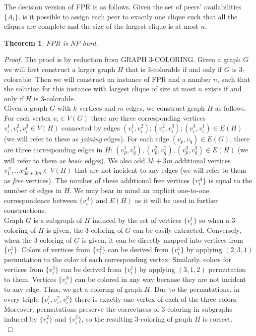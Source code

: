 \documentclass{pracamgren}
\newcounter{collective_ctr} \numberwithin{collective_ctr}{chapter}
\newtheorem{theorem}[collective_ctr]{Theorem}
\begin{document}
The decision version of FPR is as follows. Given the set of peers' availabilities $\{A_i\}$, is it possible to assign each peer to exactly one clique such that all the cliques are complete and the size of the largest clique is at most $n$.

\begin{theorem}
FPR is NP-hard.
\end{theorem}
\begin{proof}

The proof is by reduction from GRAPH 3-COLORING. Given a graph $G$ we will first construct a larger graph $H$ that is 3-colorable if and only if $G$ is 3-colorable. Then we will construct an instance of FPR and a number $n$, such that the solution for this instance with largest clique of size at most $n$ exists if and only if $H$ is 3-colorable.\\

Given a graph $G$ with $k$ vertices and $m$ edges, we construct graph $H$ as follows. For each vertex $v_i\in V(G)$ there are three corresponding vertices $v^1_i, v^2_i, v^3_i \in V(H)$ connected by edges $(v^1_i, v^2_i); (v^2_i, v^3_i); (v^3_i, v^1_i) \in E(H)$ (we will refer to these as {\it joining} edges). For each edge $(v_p, v_q) \in E(G)$, there are three corresponding edges in $H$: $(v^1_p, v^1_q), (v^2_p, v^2_q), (v^3_p, v^3_q) \in E(H)$ (we will refer to them as {\it basic} edges). We also add $3k + 3m$ additional vertices $v^A_1,\ldots v^A_{3k+3m}\in V(H)$ that are not incident to any edges (we will refer to them as {\it free} vertices). The number of these additional free vertices $\{v^A_i\}$ is equal to the number of edges in $H$. We may bear in mind an implicit one-to-one correspondence between $\{v^A_i\}$ and $E(H)$ as it will be used in further constructions.\\

Graph $G$ is a subgraph of $H$ induced by the set of vertices $\{v^1_i\}$ so when a 3-coloring of $H$ is given, the 3-coloring of $G$ can be easily extracted. Conversely, when the 3-coloring of $G$ is given, it can be directly mapped into vertices from $\{v^1_i\}$. Colors of vertices from $\{v^2_i\}$ can be derived from $\{v^1_i\}$ by applying $(2,3,1)$ permutation to the color of each corresponding vertex. Similarly, colors for vertices from $\{v^3_i\}$ can be derived from $\{v^1_i\}$ by applying $(3,1,2)$ permutation to them. Vertices $\{v^A_i\}$ can be colored in any way because they are not incident to any edge. Thus, we get a coloring of graph $H$. Due to the permutations, in every triple $\{v^1_i, v^2_i, v^3_i\}$ there is exactly one vertex of each of the three colors. Moreover, permutations preserve the correctness of 3-coloring in subgraphs induced by $\{v^2_i\}$ and $\{v^3_i\}$, so the resulting 3-coloring of graph $H$ is correct.\\


\end{proof}
\end{document}
